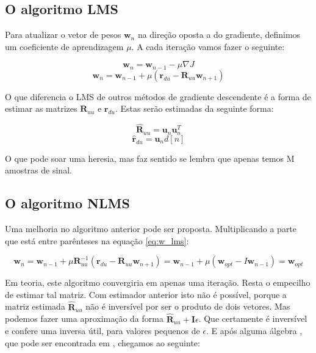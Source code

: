 \subsection{O algoritmo LMS}

Para atualizar o vetor de pesos $\boldsymbol{w}_n$ na direção oposta a do gradiente, definimos um coeficiente de aprendizagem $\mu$. A cada iteração vamos fazer o seguinte:

\begin{equation*}
\boldsymbol{w}_{n}=\boldsymbol{w}_{n-1} - \mu \nabla J
\end{equation*}
\begin{equation}
\boldsymbol{w}_{n}=\boldsymbol{w}_{n-1} + \mu(\boldsymbol{r}_{du}-\boldsymbol{R}_{uu} \boldsymbol{w}_{n+1})
\label{eq:w_lms}
\end{equation}

O que diferencia o LMS de outros métodos de gradiente descendente é a forma de estimar as matrizes $\boldsymbol{R}_{uu}$ e $\boldsymbol{r}_{du}$. Estas serão estimadas da seguinte forma:

\begin{equation}
\boldsymbol{\hat{R}}_{uu}=\boldsymbol{u}_n \boldsymbol{u}_{n}^T
\end{equation}
\begin{equation}
\boldsymbol{\hat{r}}_{du}=\boldsymbol{u}_n d[n]
\end{equation}

O que pode soar uma heresia, mas faz sentido se lembra que apenas temos M amostras de sinal.

\subsection{O algoritmo NLMS}

Uma melhoria no algoritmo anterior pode ser proposta. Multiplicando a parte que está entre parênteses na equação \ref{eq:w_lms}:

\begin{equation}
\boldsymbol{w}_{n}=\boldsymbol{w}_{n-1} + \mu \boldsymbol{R}_{uu}^{-1}(\boldsymbol{r}_{du}-\boldsymbol{R}_{uu} \boldsymbol{w}_{n+1}) = \boldsymbol{w}_{n-1} + \mu(\boldsymbol{w}_{opt} - I \boldsymbol{w}_{n-1}) = \boldsymbol{w}_{opt}
\end{equation}

Em teoria, este algoritmo convergiria em apenas uma iteração. Resta o empecilho de estimar tal matriz. Com estimador anterior isto não é possível, porque a matriz estimada $\boldsymbol{\hat{R}}_{uu}$ não é inversível por ser o produto de dois vetores. Mas podemos fazer uma aproximação da forma $\boldsymbol{\hat{R}}_{uu} + \boldsymbol{I} \epsilon$. Que certamente é inversível e confere uma inversa útil, para valores pequenos de $\epsilon$. E após alguma álgebra \cite{bessegato2012line}, que pode ser encontrada em \cite{haykin2005adaptive}, chegamos ao seguinte:

